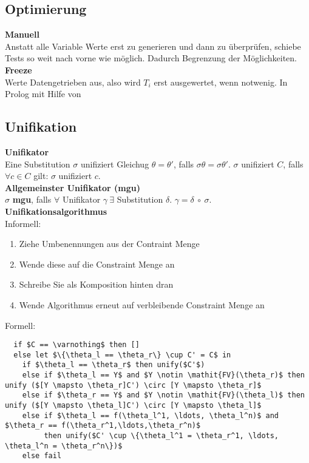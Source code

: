 \subsection{Optimierung}
\textbf{Manuell}\\
Anstatt alle Variable Werte erst zu generieren und dann zu überprüfen, schiebe Tests so weit nach vorne wie möglich.
Dadurch Begrenzung der Möglichkeiten.\\

\textbf{Freeze}\\
Werte Datengetrieben aus, also wird \(T_i\) erst ausgewertet, wenn notwenig.
In Prolog mit Hilfe von 

\subsection{Unifikation}
\textbf{Unifikator}\\
Eine Substitution \(\sigma\) unifiziert Gleichug \(\theta = \theta'\), falls \(\sigma\theta = \sigma\theta'\).
\(\sigma\) unifiziert \(C\), falls \(\forall c \in C\) gilt: \(\sigma\) unifiziert \(c\).\\
\textbf{Allgemeinster Unifikator (mgu)}\\
\(\sigma\) \textbf{mgu}, falls \(\forall\) Unifikator \(\gamma\ \exists\) Substitution \(\delta\). \( \gamma = \delta\ \circ\ \sigma\).\\

\textbf{Unifikationsalgorithmus}\\
Informell:
\begin{enumerate}
  \item Ziehe Umbenennungen aus der Contraint Menge
  \item Wende diese auf die Constraint Menge an
  \item Schreibe Sie als Komposition hinten dran
  \item Wende Algorithmus erneut auf verbleibende Constraint Menge an
\end{enumerate}
Formell:
\begin{lstlisting}
  if $C == \varnothing$ then []
  else let $\{\theta_l == \theta_r\} \cup C' = C$ in
    if $\theta_l == \theta_r$ then unify($C'$)
    else if $\theta_l == Y$ and $Y \notin \mathit{FV}(\theta_r)$ then unify ($[Y \mapsto \theta_r]C') \circ [Y \mapsto \theta_r]$
    else if $\theta_r == Y$ and $Y \notin \mathit{FV}(\theta_l)$ then unify ($[Y \mapsto \theta_l]C') \circ [Y \mapsto \theta_l]$
    else if $\theta_l == f(\theta_l^1, \ldots, \theta_l^n)$ and $\theta_r == f(\theta_r^1,\ldots,\theta_r^n)$
         then unify($C' \cup \{\theta_l^1 = \theta_r^1, \ldots, \theta_l^n = \theta_r^n\})$
    else fail
\end{lstlisting}
  
